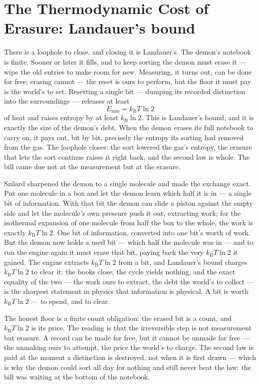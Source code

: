 \section{The Thermodynamic Cost of Erasure: Landauer's bound}
\label{se:landauer}

There is a loophole to close, and closing it is Landauer's. The demon's notebook is finite. Sooner or later
it fills, and to keep sorting the demon must erase it --- wipe the old entries to make room for new.
Measuring, it turns out, can be done for free; erasing cannot --- the reset is ours to perform, but the floor
it must pay is the world's to set. Resetting a single bit --- dumping its recorded distinction into the
surroundings --- releases at least
\begin{equation}
  E_{\min} = k_{\mathrm{B}} T \ln 2
\end{equation}
of heat and raises entropy by at least $k_{\mathrm{B}}\ln 2$. This is Landauer's bound, and it is exactly the
size of the demon's debt. When the demon erases its full notebook to carry on, it pays out, bit by bit,
precisely the entropy its sorting had removed from the gas. The loophole closes: the sort lowered the gas's
entropy, the erasure that lets the sort continue raises it right back, and the second law is whole. The bill
came due not at the measurement but at the erasure.

Szilard sharpened the demon to a single molecule and made the exchange exact. Put one molecule in a box and
let the demon learn which half it is in --- a single bit of information. With that bit the demon can slide a
piston against the empty side and let the molecule's own pressure push it out, extracting work; for the
isothermal expansion of one molecule from half the box to the whole, the work is exactly $k_{\mathrm{B}} T
\ln 2$. One bit of information, converted into one bit's worth of work. But the demon now holds a used bit ---
which half the molecule was in --- and to run the engine again it must erase that bit, paying back the very
$k_{\mathrm{B}} T \ln 2$ it gained. The engine extracts $k_{\mathrm{B}} T \ln 2$ from a bit, and Landauer's
bound charges $k_{\mathrm{B}} T \ln 2$ to clear it: the books close, the cycle yields nothing, and the exact
equality of the two --- the work ours to extract, the debt the world's to collect --- is the sharpest statement
in physics that information is physical. A bit is worth
$k_{\mathrm{B}} T \ln 2$ --- to spend, and to clear.

The honest floor is a finite count obligation: the erased bit is a count, and $k_{\mathrm{B}} T \ln 2$ is its
price. The reading is that the irreversible step is not measurement but erasure. A record can be made for
free, but it cannot be unmade for free --- the unmaking ours to attempt, the price the world's to charge. The
second law is paid at the moment a distinction is destroyed, not when it is first drawn --- which is why the demon could sort all day for nothing and still never beat the law:
the bill was waiting at the bottom of the notebook.

